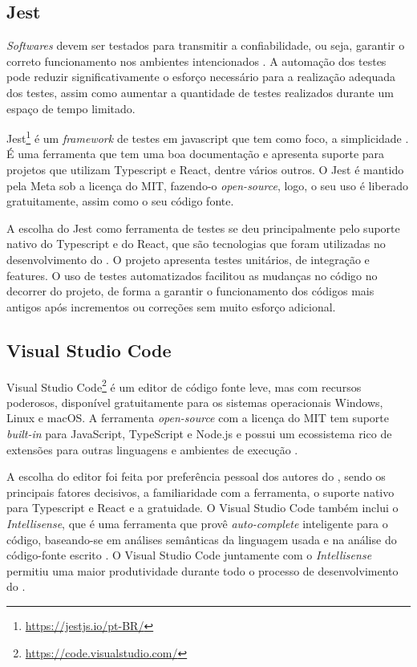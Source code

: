 \subsection{Jest}

\textit{Softwares} devem ser testados para transmitir a confiabilidade, ou seja, garantir o correto funcionamento nos ambientes intencionados \cite{test_automation}. A automação dos testes pode reduzir significativamente o esforço necessário para a realização adequada dos testes, assim como aumentar a quantidade de testes realizados durante um espaço de tempo limitado.

Jest\footnote{\url{https://jestjs.io/pt-BR/}} é um \textit{framework} de testes em javascript que tem como foco, a simplicidade \cite{jest}. É uma ferramenta que tem uma boa documentação e apresenta suporte para projetos que utilizam Typescript e React, dentre vários outros. O Jest é mantido pela Meta sob a licença do MIT, fazendo-o \textit{open-source}, logo, o seu uso é liberado gratuitamente, assim como o seu código fonte.

A escolha do Jest como ferramenta de testes se deu principalmente pelo suporte nativo do Typescript e do React, que são tecnologias que foram utilizadas no desenvolvimento do \appName. O projeto apresenta testes unitários, de integração e features. O uso de testes automatizados facilitou as mudanças no código no decorrer do projeto, de forma a garantir o funcionamento dos códigos mais antigos após incrementos ou correções sem muito esforço adicional.

\subsection{Visual Studio Code}

Visual Studio Code\footnote{\url{https://code.visualstudio.com/}} é um editor de código fonte leve, mas com recursos poderosos, disponível gratuitamente para os sistemas operacionais Windows, Linux e macOS. A ferramenta \textit{open-source} com a licença do MIT tem suporte \textit{built-in} para JavaScript, TypeScript e Node.js e possui um ecossistema rico de extensões para outras linguagens e ambientes de execução \cite{vscode}.

A escolha do editor foi feita por preferência pessoal dos autores do \appName, sendo os principais fatores decisivos, a familiaridade com a ferramenta, o suporte nativo para Typescript e React e a gratuidade. O Visual Studio Code também inclui o \textit{Intellisense}, que é uma ferramenta que provê \textit{auto-complete} inteligente para o código, baseando-se em análises semânticas da linguagem usada e na análise do código-fonte escrito \cite{intellisense}. O Visual Studio Code juntamente com o \textit{Intellisense} permitiu uma maior produtividade durante todo o processo de desenvolvimento do \appName.

